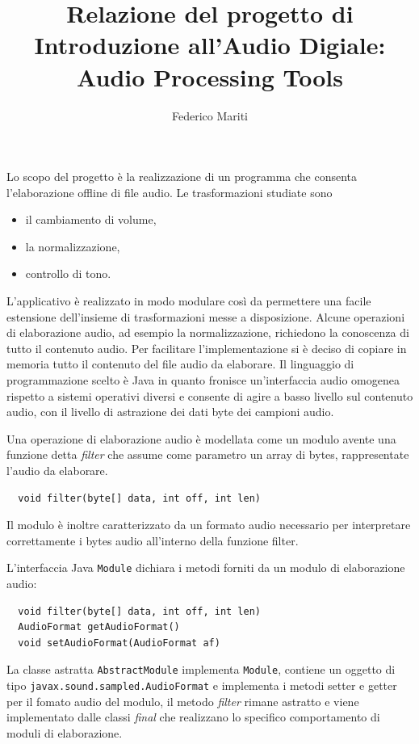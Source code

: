 \documentclass[a4papper]{article}
\begin{document}
\title{Relazione del progetto di\\Introduzione all'Audio Digiale:\\Audio Processing Tools}
\author{Federico Mariti}
\maketitle


Lo scopo del progetto \`e la realizzazione di un programma che
consenta l'elaborazione offline di file audio. Le trasformazioni studiate sono 
\begin{itemize}
\item il cambiamento di volume,
\item la normalizzazione,
\item controllo di tono.
  \end{itemize}
L'applicativo \`e realizzato in modo modulare cos\`i da permettere una
facile estensione dell'insieme di trasformazioni messe a
disposizione. Alcune operazioni di elaborazione audio, ad esempio la
normalizzazione, richiedono la conoscenza di tutto il contenuto
audio. Per facilitare l'implementazione si \`e deciso di copiare in
memoria tutto il contenuto del file audio da elaborare. Il linguaggio
di programmazione scelto \`e Java in quanto fronisce un'interfaccia
audio omogenea rispetto a sistemi operativi diversi e consente di
agire a basso livello sul contenuto audio, con il livello di
astrazione dei dati byte dei campioni audio.

Una operazione di elaborazione audio \`e modellata come un modulo
avente una funzione detta \emph{filter} che assume come parametro un
array di bytes, rappresentate l'audio da elaborare. 
\begin{lstlisting}
  void filter(byte[] data, int off, int len)
\end{lstlisting}
Il modulo \`e inoltre caratterizzato da un formato audio necessario
per interpretare correttamente i bytes audio all'interno della
funzione filter.

L'interfaccia Java \verb+Module+ dichiara i metodi forniti da un
modulo di elaborazione audio:
\begin{lstlisting}
  void filter(byte[] data, int off, int len)
  AudioFormat getAudioFormat()
  void setAudioFormat(AudioFormat af)
\end{lstlisting}
La classe astratta \verb+AbstractModule+ implementa \verb+Module+,
contiene un oggetto di tipo \verb+javax.sound.sampled.AudioFormat+ e
implementa i metodi setter e getter per il fomato audio del modulo, il
metodo \emph{filter} rimane astratto e viene implementato dalle classi
\emph{final} che realizzano lo specifico comportamento di moduli di
elaborazione.
\end{document}
